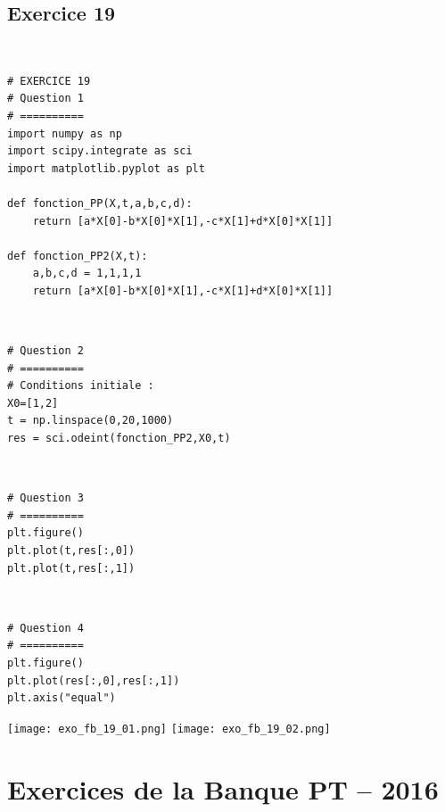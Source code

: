 \documentclass[10pt,fleqn]{article} %
\begin{document}
\subsection*{Exercice 19}

\begin{corrige}
$\quad$
\begin{lstlisting}
# EXERCICE 19
# Question 1 
# ==========
import numpy as np
import scipy.integrate as sci
import matplotlib.pyplot as plt

def fonction_PP(X,t,a,b,c,d):
    return [a*X[0]-b*X[0]*X[1],-c*X[1]+d*X[0]*X[1]]

def fonction_PP2(X,t):
    a,b,c,d = 1,1,1,1
    return [a*X[0]-b*X[0]*X[1],-c*X[1]+d*X[0]*X[1]]
\end{lstlisting}
\end{corrige}


\begin{corrige}
$\quad$
\begin{lstlisting}
# Question 2 
# ==========
# Conditions initiale : 
X0=[1,2]
t = np.linspace(0,20,1000)
res = sci.odeint(fonction_PP2,X0,t)
\end{lstlisting}
\end{corrige}

\begin{corrige}
$\quad$
\begin{lstlisting}
# Question 3 
# ==========
plt.figure()
plt.plot(t,res[:,0])
plt.plot(t,res[:,1])
\end{lstlisting}
\end{corrige}

\begin{corrige}
$\quad$
\begin{lstlisting}
# Question 4 
# ==========
plt.figure()
plt.plot(res[:,0],res[:,1])
plt.axis("equal")
\end{lstlisting}
\end{corrige}



\begin{center}
\texttt{[image: exo\_fb\_19\_01.png]}
\texttt{[image: exo\_fb\_19\_02.png]}
\end{center}

%

\newpage 
\section{Exercices de la Banque PT -- 2016}
\end{document}
